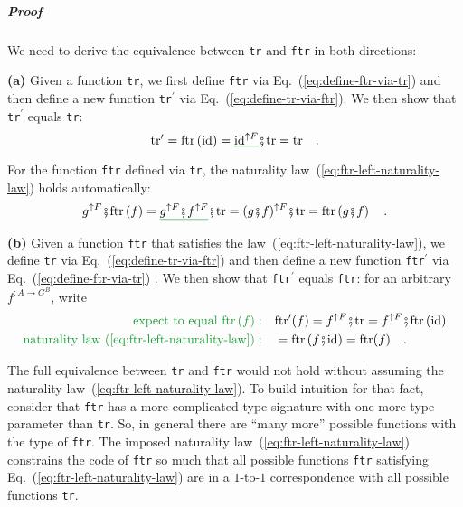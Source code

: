\subparagraph{Proof}

We need to derive the equivalence between \lstinline!tr! and \lstinline!ftr!
in both directions:

\textbf{(a)} Given a function \lstinline!tr!, we first define \lstinline!ftr!
via Eq.~(\ref{eq:define-ftr-via-tr}) and then define a new function
\lstinline!tr!$^{\prime}$ via Eq.~(\ref{eq:define-tr-via-ftr}).
We then show that \lstinline!tr!$^{\prime}$ equals \lstinline!tr!:
\[
\text{tr}^{\prime}=\text{ftr}\left(\text{id}\right)=\gunderline{\text{id}^{\uparrow F}}\bef\text{tr}=\text{tr}\quad.
\]

For the function \lstinline!ftr! defined via \lstinline!tr!, the
naturality law~(\ref{eq:ftr-left-naturality-law}) holds automatically:
\[
g^{\uparrow F}\bef\text{ftr}\left(f\right)=\gunderline{g^{\uparrow F}\bef f^{\uparrow F}}\bef\text{tr}=(g\bef f)^{\uparrow F}\bef\text{tr}=\text{ftr}\left(g\bef f\right)\quad.
\]

\textbf{(b)} Given a function \lstinline!ftr! that satisfies the
law~(\ref{eq:ftr-left-naturality-law}), we define \lstinline!tr!
via Eq.~(\ref{eq:define-tr-via-ftr}) and then define a new function
\lstinline!ftr!$^{\prime}$ via Eq.~(\ref{eq:define-ftr-via-tr})
. We then show that \lstinline!ftr!$^{\prime}$ equals \lstinline!ftr!:
for an arbitrary $f^{:A\rightarrow G^{B}}$, write
\begin{align*}
{\color{greenunder}\text{expect to equal }\text{ftr}\left(f\right):}\quad & \text{ftr}^{\prime}(f)=f^{\uparrow F}\bef\text{tr}=f^{\uparrow F}\bef\text{ftr}\left(\text{id}\right)\\
{\color{greenunder}\text{naturality law~(\ref{eq:ftr-left-naturality-law})}:}\quad & =\text{ftr}\left(f\bef\text{id}\right)=\text{ftr}(f)\quad.
\end{align*}

The full equivalence between \lstinline!tr! and \lstinline!ftr!
would not hold without assuming the naturality law~(\ref{eq:ftr-left-naturality-law}).
To build intuition for that fact, consider that \lstinline!ftr! has
a more complicated type signature with one more type parameter than
\lstinline!tr!. So, in general there are \textsf{``}many more\textsf{''} possible
functions with the type of \lstinline!ftr!. The imposed naturality
law~(\ref{eq:ftr-left-naturality-law}) constrains the code of \lstinline!ftr!
so much that all possible functions \lstinline!ftr! satisfying Eq.~(\ref{eq:ftr-left-naturality-law})
are in a $1$-to-$1$ correspondence with all possible functions \lstinline!tr!.

